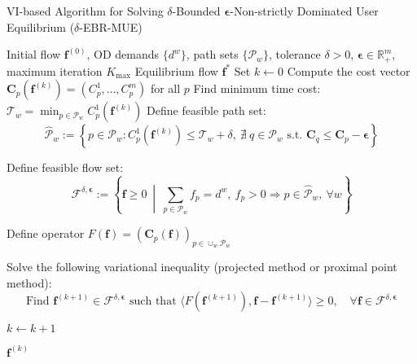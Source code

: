 \documentclass[11pt]{article}
\begin{document}
\begin{algorithm}[H]
\caption{VI-based Algorithm for Solving $\delta$-Bounded $\boldsymbol{\epsilon}$-Non-strictly Dominated User Equilibrium ($\delta$-EBR-MUE)}
\label{alg:vi-delta-eps}
\begin{algorithmic}[1]
\Require Initial flow \(\mathbf{f}^{(0)}\), OD demands \(\{d^w\}\), path sets \(\{\mathcal{P}_w\}\), tolerance \(\delta > 0\), \(\boldsymbol{\epsilon} \in \mathbb{R}_+^m\), maximum iteration \(K_{\max}\)
\Ensure Equilibrium flow \(\mathbf{f}^*\)
\State Set \(k \gets 0\)
\Repeat
    \State Compute the cost vector \(\mathbf{C}_p(\mathbf{f}^{(k)}) = (C_p^1, \dots, C_p^m)\) for all \(p\)
        \State Find minimum time cost: \(\mathcal{T}_w = \min_{p \in \mathcal{P}_w} C_p^1(\mathbf{f}^{(k)})\)
        \State Define feasible path set:
        \[
        \hat{\mathcal{P}}_w := \left\{ p \in \mathcal{P}_w : C^1_p(\mathbf{f}^{(k)}) \leq \mathcal{T}_w + \delta,~\nexists~ q \in \mathcal{P}_w \text{ s.t. } \mathbf{C}_q \leq \mathbf{C}_p - \boldsymbol{\epsilon} \right\}
        \]
    \EndFor

    \State Define feasible flow set:
    \[
    \mathcal{F}^{\delta,\boldsymbol{\epsilon}} := \left\{ \mathbf{f} \geq 0 ~\middle|~ \sum_{p \in \mathcal{P}_w} f_p = d^w,~ f_p > 0 \Rightarrow p \in \hat{\mathcal{P}}_w,~\forall w \right\}
    \]

    \State Define operator \( F(\mathbf{f}) = \left( \mathbf{C}_p(\mathbf{f}) \right)_{p \in \cup_w \mathcal{P}_w} \)
    
    \State Solve the following variational inequality (projected method or proximal point method):
    \[
    \text{Find } \mathbf{f}^{(k+1)} \in \mathcal{F}^{\delta,\boldsymbol{\epsilon}} \text{ such that } \langle F(\mathbf{f}^{(k+1)}), \mathbf{f} - \mathbf{f}^{(k+1)} \rangle \geq 0, \quad \forall \mathbf{f} \in \mathcal{F}^{\delta,\boldsymbol{\epsilon}}
    \]
    
    \State \(k \gets k + 1\)

\State \Return \(\mathbf{f}^{(k)}\)
\end{algorithmic}
\end{algorithm}
\end{document}
